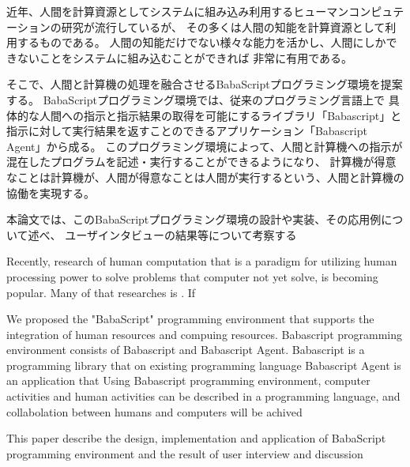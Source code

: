 \begin{jabstract}

近年、人間を計算資源としてシステムに組み込み利用するヒューマンコンピュテーションの研究が流行しているが、
その多くは人間の知能を計算資源として利用するものである。
人間の知能だけでない様々な能力を活かし、人間にしかできないことをシステムに組み込むことができれば
非常に有用である。

そこで、人間と計算機の処理を融合させるBabaScriptプログラミング環境を提案する。
BabaScriptプログラミング環境では、従来のプログラミング言語上で
具体的な人間への指示と指示結果の取得を可能にするライブラリ「Babascript」と
指示に対して実行結果を返すことのできるアプリケーション「Babascript Agent」から成る。
このプログラミング環境によって、人間と計算機への指示が混在したプログラムを記述・実行することができるようになり、
計算機が得意なことは計算機が、人間が得意なことは人間が実行するという、人間と計算機の協働を実現する。

本論文では、このBabaScriptプログラミング環境の設計や実装、その応用例について述べ、
ユーザインタビューの結果等について考察する

%

\end{jabstract}

\begin{eabstract}
Recently, research of human computation that is a paradigm for utilizing human processing power to solve problems that computer not yet solve, is becoming popular.
Many of that researches is .
If

We proposed the "BabaScript" programming environment that supports the integration of human resources and compuing resources.
Babascript programming environment consists of Babascript and Babascript Agent.
Babascript is a programming library that  on existing programming language
Babascript Agent is an application that
Using Babascript programming environment, computer activities and human activities can be described
in a programming language, and collabolation between humans and computers will be achived

This paper describe the design, implementation and application of BabaScript programming environment
and the result of user interview and discussion

\end{eabstract}
